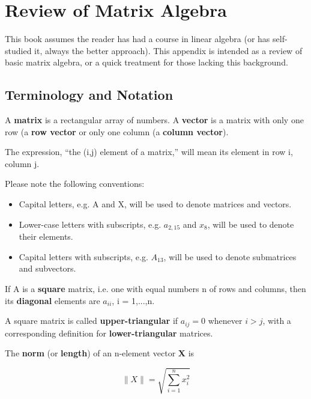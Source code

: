 \chapter{Review of Matrix Algebra}
\label{chap:matrix review}

This book assumes the reader has had a course in linear algebra (or has
self-studied it, always the better approach).  This appendix is intended
as a review of basic matrix algebra, or a quick treatment for those
lacking this background.

\section{Terminology and Notation}

A {\bf matrix} is a rectangular array of numbers.  A {\bf vector} is a
matrix with only one row (a {\bf row vector} or only one column (a {\bf
column vector}).

The expression, ``the (i,j) element of a matrix,'' will mean its element
in row i, column j.

Please note the following conventions:

\begin{itemize}

\item Capital letters, e.g. A and X, will be used to denote matrices and
vectors.  

\item Lower-case letters with subscripts, e.g. $a_{2,15}$ and $x_8$,
will be used to denote their elements.

\item Capital letters with subscripts, e.g. $A_{13}$, will be used to
denote submatrices and subvectors.

\end{itemize}

If A is a {\bf square} matrix, i.e. one with equal numbers n of rows and
columns, then its {\bf diagonal} elements are $a_{ii}$, i = 1,...,n.

A square matrix is called {\bf upper-triangular} if $a_{ij} = 0$
whenever $i > j$, with a corresponding definition for {\bf
lower-triangular} matrices.

The {\bf norm} (or {\bf length}) of an n-element vector {\bf X} is 

\begin{equation}
\parallel{X} \parallel = \sqrt{\sum_{i=1}^n x_i^2}
\end{equation}


